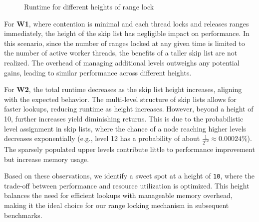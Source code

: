 \begin{figure}[h]
    \centering
    \caption{Runtime for different heights of range lock}
\end{figure}

For \textbf{W1}, where contention is minimal and each thread locks and releases ranges immediately, the height of the skip list has negligible impact on performance. In this scenario, since the number of ranges locked at any given time is limited to the number of active worker threads, the benefits of a taller skip list are not realized. The overhead of managing additional levels outweighs any potential gains, leading to similar performance across different heights.

For \textbf{W2}, the total runtime decreases as the skip list height increases, aligning with the expected behavior. The multi-level structure of skip lists allows for faster lookups, reducing runtime as height increases. However, beyond a height of 10, further increases yield diminishing returns. This is due to the probabilistic level assignment in skip lists, where the chance of a node reaching higher levels decreases exponentially (e.g., level 12 has a probability of about \(\frac{1}{2^{12}} \approx 0.00024\%\)). The sparsely populated upper levels contribute little to performance improvement but increase memory usage.

Based on these observations, we identify a sweet spot at a height of \texttt{10}, where the trade-off between performance and resource utilization is optimized. This height balances the need for efficient lookups with manageable memory overhead, making it the ideal choice for our range locking mechanism in subsequent benchmarks.

